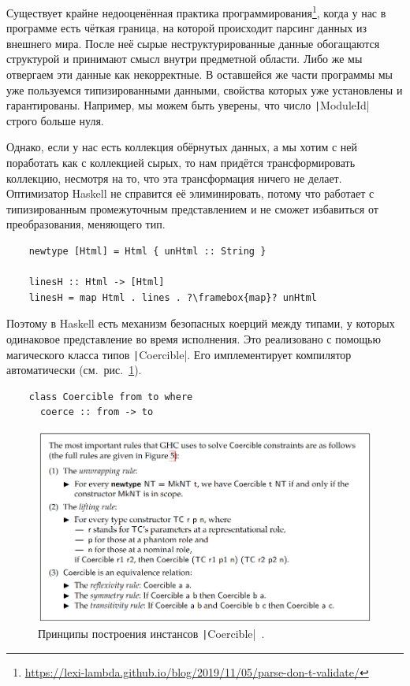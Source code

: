 Существует крайне недооценённая практика программирования\footnote{\url{https://lexi-lambda.github.io/blog/2019/11/05/parse-don-t-validate/}}, когда у нас в программе есть чёткая граница, на которой происходит парсинг данных из внешнего мира.
После неё сырые неструктурированные данные обогащаются структурой и принимают смысл внутри предметной области.
Либо же мы отвергаем эти данные как некорректные.
В оставшейся же части программы мы уже пользуемся типизированными данными, свойства которых уже установлены и гарантированы.
Например, мы можем быть уверены, что число \texttt|ModuleId| строго больше нуля.

Однако, если у нас есть коллекция обёрнутых данных, а мы хотим с ней поработать как с коллекцией сырых, то нам придётся трансформировать коллекцию, несмотря на то, что эта трансформация ничего не делает.
Оптимизатор Haskell не справится её элиминировать, потому что работает с типизированным промежуточным представлением и не сможет избавиться от преобразования, меняющего тип.
\begin{verbatim}
    newtype [Html] = Html { unHtml :: String }

    linesH :: Html -> [Html]
    linesH = map Html . lines . ?\framebox{map}? unHtml
\end{verbatim}

Поэтому в Haskell есть механизм безопасных коерций между типами, у которых одинаковое представление во время исполнения.
Это реализовано с помощью магического класса типов \texttt|Coercible|.
Его имплементирует компилятор автоматически (см.\ рис.~\ref{fig:coersions}).
\begin{verbatim}
    class Coercible from to where
      coerce :: from -> to
\end{verbatim}

\begin{figure}[h]
    \centering
    \includegraphics[width=\linewidth]{figs/coersions}
    \caption{Принципы построения инстансов \texttt|Coercible|~\cite{breitner2014safe}.}
    \label{fig:coersions}
\end{figure}


